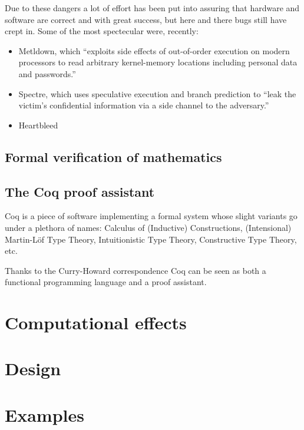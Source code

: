 \documentclass[declaration,inz,english,shortabstract]{iithesis}
\begin{document}
Due to these dangers a lot of effort has been put into assuring that hardware and software are correct and with great success, but here and there bugs still have crept in. Some of the most spectecular were, recently:

\begin{itemize}
    \item Metldown, which ``exploits side effects of out-of-order execution on modern processors to read arbitrary kernel-memory locations including  personal  data  and  passwords.'' \cite{Meltdown}
    \item Spectre, which uses speculative execution and branch prediction to ``leak the victim's confidential information via a side  channel to  the  adversary.'' \cite{Spectre}
    \item Heartbleed \cite{Heartbleed}
\end{itemize}

\section{Formal verification of mathematics}



\section{The Coq proof assistant}

Coq \cite{Coq} is a piece of software implementing a formal system whose slight variants go under a plethora of names: Calculus of (Inductive) Constructions, (Intensional) Martin-L\"of Type Theory, Intuitionistic Type Theory, Constructive Type Theory, etc.

Thanks to the Curry-Howard correspondence \cite{CH} Coq can be seen as both a functional programming language and a proof assistant.



\chapter{Computational effects}

\chapter{Design}

\chapter{Examples}
\end{document}
